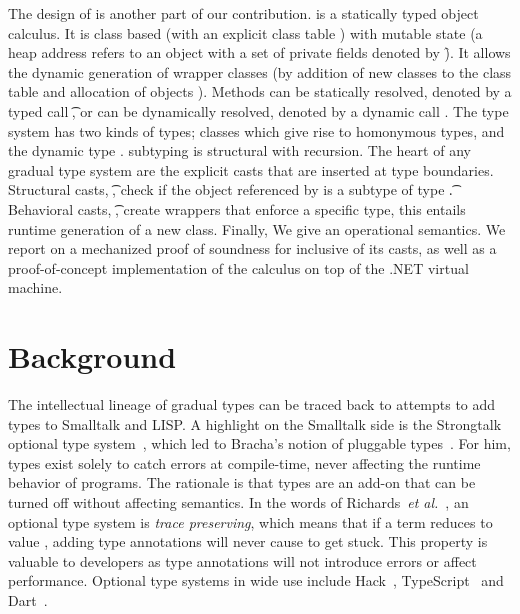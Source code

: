 \documentclass[runnningheads]{tex/llncs}
\begin{document}
The design of \kafka is another part of our contribution.  \kafka is a
statically typed object calculus.  It is class based (with an explicit class
table \K) with mutable state (a heap address \a refers to an object with a
set of private fields denoted by \f). It allows the dynamic generation of
wrapper classes (by addition of new classes to the class table \K and
allocation of objects \a).  Methods can be statically resolved, denoted by a
typed call \KCall\a\m\x\t\tp, or can be dynamically resolved, denoted by a
dynamic call \DynCall\a\m\x. The \kafka type system has two kinds of types;
classes which give rise to homonymous types, and the dynamic type \any.
\kafka subtyping is structural with recursion.  The heart of any gradual
type system are the explicit casts that are inserted at type boundaries.
Structural casts, \SubCast\t\a, check if the object referenced by \a is a
subtype of type \t.  Behavioral casts, \BehCast\t\a, create wrappers that
enforce a specific type, this entails runtime generation of a new
class. Finally, We give \kafka an operational semantics. We report on a
mechanized proof of soundness for \kafka inclusive of its casts, as well as
a proof-of-concept implementation of the calculus on top of the .NET virtual
machine.

\section{Background}


\noindent The intellectual lineage of gradual types can be traced back to
attempts to add types to Smalltalk and LISP. A highlight on the Smalltalk
side is the Strongtalk optional type system~\cite{Bracha93}, which led to
Bracha's notion of pluggable types~\cite{pluggabletypes}. For him, types
exist solely to catch errors at compile-time, never affecting the runtime
behavior of programs. The rationale is that types are an add-on that can be
turned off without affecting semantics.  In the words of Richards~\emph{et
  al.}~\cite{ecoop15}, an optional type system is \emph{trace preserving},
which means that if a term \e reduces to value \a, adding type annotations
will never cause \e to get stuck. This property is valuable to developers as
type annotations will not introduce errors or affect performance.  Optional
type systems in wide use include Hack~\cite{hack13}, TypeScript~\cite{BAT14}
and Dart~\cite{dart13}.
\end{document}
